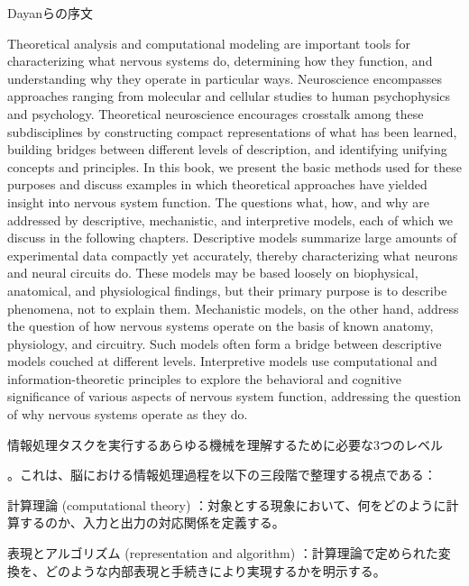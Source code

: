 \documentclass[titlepage]{ltjsbook}
\begin{document}

%


Dayanらの序文

Theoretical analysis and computational modeling are important tools for characterizing what nervous systems do, determining how they function, and understanding why they operate in particular ways. Neuroscience encompasses approaches ranging from molecular and cellular studies to human psychophysics and psychology. Theoretical neuroscience encourages crosstalk among these subdisciplines by constructing compact representations of what has been learned, building bridges between different levels of description, and identifying unifying concepts and principles. In this book, we present the basic methods used for these purposes and discuss examples in which theoretical approaches have yielded insight into nervous system function. The questions what, how, and why are addressed by descriptive, mechanistic, and interpretive models, each of which we discuss in the following chapters. Descriptive models summarize large amounts of experimental data compactly yet accurately, thereby characterizing what neurons and neural circuits do. These models may be based loosely on biophysical, anatomical, and physiological findings, but their primary purpose is to describe phenomena, not to explain them. Mechanistic models, on the other hand, address the question of how nervous systems operate on the basis of known anatomy, physiology, and circuitry. Such models often form a bridge between descriptive models couched at different levels. Interpretive models use computational and information-theoretic principles to explore the behavioral and cognitive significance of various aspects of nervous system function, addressing the question of why nervous systems operate as they do.

情報処理タスクを実行するあらゆる機械を理解するために必要な3つのレベル


。これは、脳における情報処理過程を以下の三段階で整理する視点である：

計算理論 (computational theory) ：対象とする現象において、何をどのように計算するのか、入力と出力の対応関係を定義する。

表現とアルゴリズム (representation and algorithm) ：計算理論で定められた変換を、どのような内部表現と手続きにより実現するかを明示する。
\end{document}
